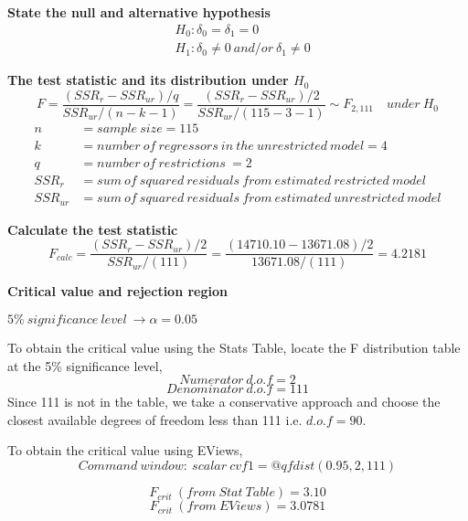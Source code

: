 \documentclass[12pt]{report}
\begin{document}
\justify
\noindent \textbf{State the null and alternative hypothesis}
\begin{align*}
	&H_0: \delta_0 = \delta_1 = 0 \\
	&H_1: \delta_0 \neq 0\ and/or\ \delta_1 \neq 0
\end{align*}

\noindent \textbf{The test statistic and its distribution under $H_0$}
$$F = \dfrac{(SSR_r - SSR_{ur})/q}{SSR_{ur}/(n-k-1)} = \dfrac{(SSR_r - SSR_{ur})/2}{SSR_{ur}/(115-3-1)} \sim F_{2,111} \quad under\ H_0$$
\begin{align*}
n &= sample\ size = 115 \\
k &= number\ of\ regressors\ in\ the\ unrestricted\ model = 4 \\
q &= number\ of\ restrictions\ = 2 \\
SSR_{r} &= sum\ of\ squared\ residuals\ from\ estimated\ restricted\ model \\
SSR_{ur} &= sum\ of\ squared\ residuals\ from\ estimated\ unrestricted\ model
\end{align*}

\noindent \textbf{Calculate the test statistic}
$$F_{calc} = \dfrac{(SSR_r - SSR_{ur})/2}{SSR_{ur}/(111)} = \dfrac{(14710.10-13671.08)/2}{13671.08/(111)} = 4.2181 $$


\noindent \textbf{Critical value and rejection region}

\noindent $5\%\ significance\ level\ \to \alpha = 0.05$

\noindent To obtain the critical value using the Stats Table, locate the F distribution table at the 5\% significance level,
$$Numerator\ d.o.f = 2$$
$$Denominator\ d.o.f = 111$$
\noindent Since 111 is not in the table, we take a conservative approach and choose the closest available degrees of freedom less than 111 i.e. $d.o.f=90$. 
\begin{figure}[H]
\end{figure}
\vspace{-\baselineskip}
\noindent To obtain the critical value using EViews,
$$Command\ window:\ scalar\ cvf1=@qfdist(0.95,2,111)$$
\begin{figure}[H]
	\centering
\end{figure}
\vspace{-\baselineskip}
\begin{figure}[H]
	\centering
\end{figure}
\vspace{-\baselineskip}
$$F_{crit}\ (from\ Stat\ Table) = 3.10$$
$$F_{crit}\ (from\ EViews) = 3.0781$$
\end{document}
